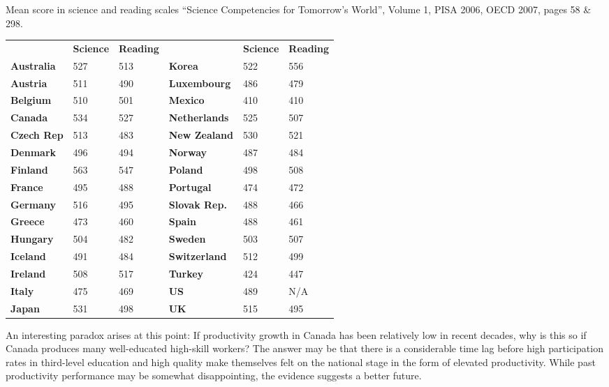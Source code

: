 \begin{Table}{25em}{Mean score in science and reading scales \label{table:sciencereading}}{``Science Competencies for Tomorrow's World'', Volume 1, PISA 2006, OECD 2007, pages 58 \& 298.}
\begin{tabu} to \linewidth {|X[2,l]X[1,c]X[1,c]X[2,l]X[1,c]X[1,c]|} \hline 
{}	& \textbf{Science} & \textbf{Reading} &  & \textbf{Science} & \textbf{Reading} \\
						\textbf{Australia}	& 527 & 513 & \textbf{Korea	}		& 522 & 556 \\
	\textbf{Austria}	& 511 & 490 & \textbf{Luxembourg}	& 486 & 479 \\ 
						\textbf{Belgium}	& 510 & 501 & \textbf{Mexico}		& 410 & 410 \\
	\textbf{Canada}		& 534 & 527 & \textbf{Netherlands}	& 525 & 507 \\
						\textbf{Czech Rep}	& 513 & 483 & \textbf{New Zealand}	& 530 & 521 \\ 
	\textbf{Denmark}	& 496 & 494 & \textbf{Norway}		& 487 & 484 \\
						\textbf{Finland}	& 563 & 547 & \textbf{Poland}		& 498 & 508 \\
	\textbf{France}		& 495 & 488 & \textbf{Portugal}		& 474 & 472 \\
						\textbf{Germany}	& 516 & 495 & \textbf{Slovak Rep.}	& 488 & 466 \\
	\textbf{Greece}		& 473 & 460 & \textbf{Spain}		& 488 & 461 \\
						\textbf{Hungary}	& 504 & 482 & \textbf{Sweden}		& 503 & 507 \\
	\textbf{Iceland} 	& 491 & 484 & \textbf{Switzerland}	& 512 & 499 \\
						\textbf{Ireland} 	& 508 & 517 & \textbf{Turkey}		& 424 & 447 \\
	\textbf{Italy} 		& 475 & 469 & \textbf{US}			& 489 & N/A \\ 
						\textbf{Japan} 		& 531 & 498 & \textbf{UK}			& 515 & 495 \\ \hline  
\end{tabu}
\end{Table}

An interesting paradox arises at this point: If productivity growth in Canada has been relatively low in recent decades, why is this so if Canada produces many well-educated high-skill workers? The answer may be that there is a considerable time lag before high participation rates in third-level education and high quality make themselves felt on the national stage in the form of elevated productivity. While past productivity performance may be somewhat disappointing, the evidence suggests a better future.
